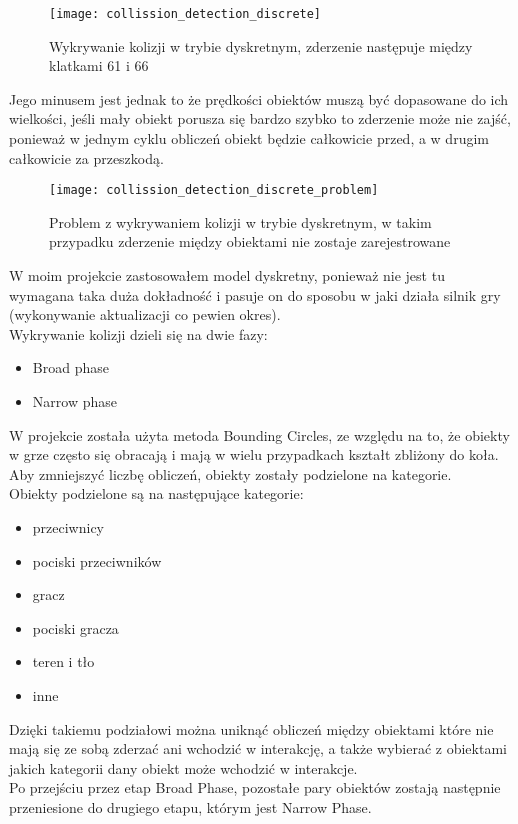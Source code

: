 \begin{figure}[h]
	\centering
	\noindent\texttt{[image: collission\_detection\_discrete]}
	\caption{Wykrywanie kolizji w trybie dyskretnym, zderzenie następuje między klatkami 61 i 66}
\end{figure}

Jego minusem jest jednak to że prędko\'sci obiektów muszą być dopasowane do ich wielko\'sci, je\'sli mały obiekt porusza się bardzo szybko to zderzenie może nie zaj\'sć, ponieważ w jednym cyklu obliczeń obiekt będzie całkowicie przed, a w drugim całkowicie za przeszkodą.\\

\begin{figure}[h]
	\centering
	\noindent\texttt{[image: collission\_detection\_discrete\_problem]}
	\caption{Problem z wykrywaniem kolizji w trybie dyskretnym, w takim przypadku zderzenie między obiektami nie zostaje zarejestrowane}
\end{figure}
\newpage

\noindent W moim projekcie zastosowałem model dyskretny, ponieważ nie jest tu wymagana taka duża dokładno\'sć i pasuje on do sposobu w jaki działa silnik gry (wykonywanie aktualizacji co pewien okres).\\

\noindent Wykrywanie kolizji dzieli się na dwie fazy:\begin{itemize}[topsep=0.2em, itemsep=0.5em, partopsep=0em, parsep=0em]
	\item Broad phase
	\item Narrow phase
\end{itemize}\bigskip



W projekcie została użyta metoda Bounding Circles, ze względu na to, że obiekty w grze często się obracają i mają w wielu przypadkach kształt zbliżony do koła. Aby zmniejszyć liczbę obliczeń, obiekty zostały podzielone na kategorie.\\

\noindent Obiekty podzielone są na następujące kategorie:\begin{itemize}[topsep=0.2em, itemsep=0.5em, partopsep=0em, parsep=0em]
	\item przeciwnicy
	\item pociski przeciwników
	\item gracz
	\item pociski gracza
	\item teren i tło
	\item inne
\end{itemize}

\noindent Dzięki takiemu podziałowi można uniknąć obliczeń między obiektami które nie mają się ze sobą zderzać ani wchodzić w interakcję, a także wybierać z obiektami jakich kategorii dany obiekt może wchodzić w interakcje.\\
Po przej\'sciu przez etap Broad Phase, pozostałe pary obiektów zostają następnie przeniesione do drugiego etapu, którym jest Narrow Phase.\\



\newpage
\cleardoublepage